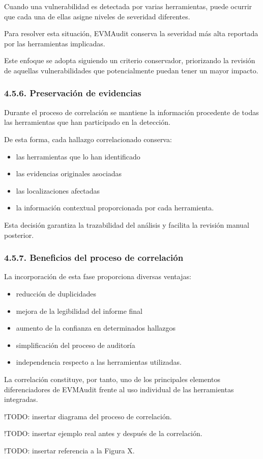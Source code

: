 Cuando una vulnerabilidad es detectada por varias herramientas, puede
ocurrir que cada una de ellas asigne niveles de severidad diferentes.

Para resolver esta situación, EVMAudit conserva la severidad más alta
reportada por las herramientas implicadas.

Este enfoque se adopta siguiendo un criterio conservador, priorizando la
revisión de aquellas vulnerabilidades que potencialmente puedan tener un
mayor impacto.

\subsubsection{4.5.6. Preservación de
evidencias}\label{preservaciuxf3n-de-evidencias}

Durante el proceso de correlación se mantiene la información procedente
de todas las herramientas que han participado en la detección.

De esta forma, cada hallazgo correlacionado conserva:

\begin{itemize}
\tightlist
\item
  las herramientas que lo han identificado
\item
  las evidencias originales asociadas
\item
  las localizaciones afectadas
\item
  la información contextual proporcionada por cada herramienta.
\end{itemize}

Esta decisión garantiza la trazabilidad del análisis y facilita la
revisión manual posterior.

\subsubsection{4.5.7. Beneficios del proceso de
correlación}\label{beneficios-del-proceso-de-correlaciuxf3n}

La incorporación de esta fase proporciona diversas ventajas:

\begin{itemize}
\tightlist
\item
  reducción de duplicidades
\item
  mejora de la legibilidad del informe final
\item
  aumento de la confianza en determinados hallazgos
\item
  simplificación del proceso de auditoría
\item
  independencia respecto a las herramientas utilizadas.
\end{itemize}

La correlación constituye, por tanto, uno de los principales elementos
diferenciadores de EVMAudit frente al uso individual de las herramientas
integradas.

!TODO: insertar diagrama del proceso de correlación.

!TODO: insertar ejemplo real antes y después de la correlación.

!TODO: insertar referencia a la Figura X.
